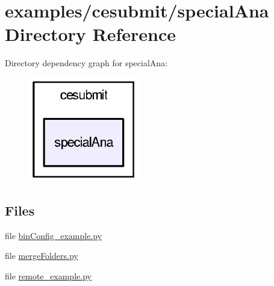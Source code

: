 \section{examples/cesubmit/special\-Ana Directory Reference}
\label{dir_5f52a5d349e3c39d8301290a550b4386}
Directory dependency graph for special\-Ana\-:
\nopagebreak
\begin{figure}[H]
\begin{center}
\leavevmode
\includegraphics[width=136pt]{dir_5f52a5d349e3c39d8301290a550b4386_dep}
\end{center}
\end{figure}
\subsection*{Files}
\begin{DoxyCompactItemize}
\item 
file \hyperlink{binConfig__example_8py}{bin\-Config\-\_\-example.\-py}
\item 
file \hyperlink{mergeFolders_8py}{merge\-Folders.\-py}
\item 
file \hyperlink{remote__example_8py}{remote\-\_\-example.\-py}
\end{DoxyCompactItemize}
